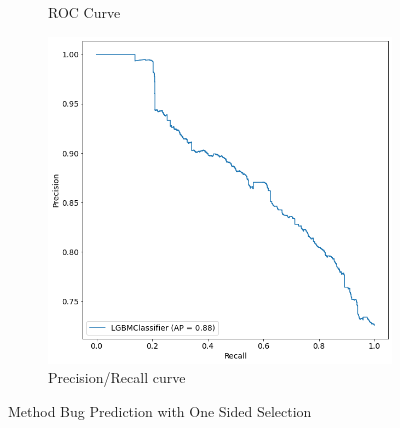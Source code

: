 \begin{figure}[H]
\begin{subfigure}{.5\textwidth}
		\caption{ROC Curve}\label{}
	\end{subfigure}%
	\begin{subfigure}{.5\textwidth}
		\centering
		\includegraphics[scale=0.3]{./src/methodBug/methodbug_onesidedselection_pr.png}
		\caption{Precision/Recall curve}\label{}
	\end{subfigure}  
	\caption{Method Bug Prediction with One Sided Selection}
	\label{results:bugprediction_best}
\end{figure}


